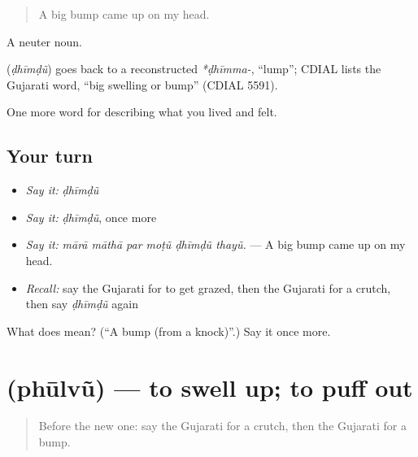 \begin{quote}
A big bump came up on my head.
\end{quote}

A neuter noun.

\begin{cousinweb}
\textbf{} (\emph{ḍhīmḍũ}) goes back to a reconstructed \emph{*ḍhīmma-}, \textquotedblleft{}lump\textquotedblright{}; CDIAL lists the Gujarati word, \textquotedblleft{}big swelling or bump\textquotedblright{} (CDIAL 5591).
\end{cousinweb}

\begin{grammarlens}[title={What you've built}]
One more word for describing what you lived and felt.
\end{grammarlens}

\subsection*{Your turn}
\begin{itemize}
\raggedright
  \item \emph{Say it:} \emph{ḍhīmḍũ}
  \item \emph{Say it:} \emph{ḍhīmḍũ}, once more
  \item \emph{Say it:} \emph{mārā māthā par moṭũ ḍhīmḍũ thayũ.} — A big bump came up on my head.
  \item \emph{Recall:} say the Gujarati for to get grazed, then the Gujarati for a crutch, then say \emph{ḍhīmḍũ} again
\end{itemize}

\begin{tcolorbox}[breakable,colback=teal!4,colframe=teal!35!black,title={Before you move on}]
What does  mean? (\textquotedblleft{}A bump (from a knock)\textquotedblright{}.) Say it once more.
\end{tcolorbox}
\section[\texorpdfstring{\gu{ફૂલવું} (phūlvũ)}{ફૂલવું (phūlvũ)}]{ (phūlvũ) — to swell up; to puff out}

\label{lesson:GU-C482-phulvu}



\begin{quote}
Before the new one: say the Gujarati for a crutch, then the Gujarati for a bump.
\end{quote}

